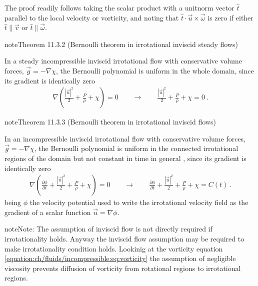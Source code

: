 \documentclass[letterpaper,10pt,english]{jupyterBook}
\begin{document}
\sphinxAtStartPar
The proof readily follows taking the scalar product with a unit\sphinxhyphen{}norm vector \(\hat{t}\) parallel to the local velocity or vorticity, and noting that \(\hat{t} \cdot \vec{u} \times \vec{\omega}\) is zero if either \(\hat{t} \parallel \vec{v}\) or \(\hat{t} \parallel \vec{\omega}\).
\label{ch/fluids/incompressible:theorem-1}
\begin{sphinxadmonition}{note}{Theorem 11.3.2 (Bernoulli theorem in irrotational inviscid steady flows)}



\sphinxAtStartPar
In a steady incompressible inviscid irrotational flow with conservative volume forces, \(\vec{g} = - \nabla \chi\), the Bernoulli polynomial is uniform in the whole domain, since its gradient is identically zero
\begin{equation*}
\begin{split}\nabla \left( \frac{|\vec{u}|^2}{2} + \frac{P}{\rho} + \chi \right) = 0 
\qquad \rightarrow \qquad \frac{|\vec{u}|^2}{2} + \frac{P}{\rho} + \chi = 0 \ .\end{split}
\end{equation*}\end{sphinxadmonition}
\label{ch/fluids/incompressible:theorem-2}
\begin{sphinxadmonition}{note}{Theorem 11.3.3 (Bernoulli theorem in irrotational inviscid flows)}



\sphinxAtStartPar
In an incompressible inviscid irrotational flow with conservative volume forces, \(\vec{g} = - \nabla \chi\), the Bernoulli polynomial is uniform in the connected irrotational regions of the domain \sphinxhyphen{} but not constant in time in general \sphinxhyphen{} , since its gradient is identically zero
\begin{equation*}
\begin{split}\nabla \left( \frac{\partial \phi}{\partial t} + \frac{|\vec{u}|^2}{2} + \frac{P}{\rho} + \chi \right) = 0 
\qquad \rightarrow \qquad \frac{\partial \phi}{\partial t} + \frac{|\vec{u}|^2}{2} + \frac{P}{\rho} + \chi = C(t) \ .\end{split}
\end{equation*}
\sphinxAtStartPar
being \(\phi\) the velocity potential used to write the irrotational velocity field as the gradient of a scalar function \(\vec{u} = \nabla \phi\).
\end{sphinxadmonition}

\begin{sphinxadmonition}{note}{Note:}
\sphinxAtStartPar
The assumption of inviscid flow is not directly required if irrotationality holds. Anyway the inviscid flow assumption may be required to make irrotationality condition holds. Lookinig at the vorticity equation \eqref{equation:ch/fluids/incompressible:eq:vorticity} the assumption of negligible viscosity prevents diffusion of vorticity from rotational regions to irrotational regions.
\end{sphinxadmonition}
\end{document}
